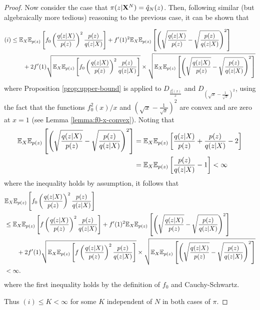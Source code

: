 \begin{proof}
Now consider the case that $\pi(z|\mathbf{X}^N) = \hat{q}_N(z)$. 
Then, following similar (but algebraically more tedious) reasoning to the previous case, it can be shown that

\begin{align*}
(i)
&\leq \mathbb{E}_{X} \mathbb{E}_{p(z)} \left[  f_0\left( \frac{q(z|X)}{p(z)} \right)^2 \frac{p(z)}{q(z|X)}\right] 
+
 f'(1)^2 \mathbb{E}_{X} \mathbb{E}_{p(z)} \left[  \left( \sqrt{\frac{q(z|X)}{p(z)}} - \sqrt{\frac{p(z)}{q(z|X)}} \right)^2\right] \\
 & \qquad + 2f'(1) \sqrt{\mathbb{E}_{X} \mathbb{E}_{p(z)} \left[  f_0\left( \frac{q(z|X)}{p(z)} \right)^2 \frac{p(z)}{q(z|X)}\right] } \times \sqrt{\mathbb{E}_{X} \mathbb{E}_{p(z)} \left[  \left( \sqrt{\frac{q(z|X)}{p(z)}} - \sqrt{\frac{p(z)}{q(z|X)}} \right)^2\right]} \\
\end{align*}
where Proposition \ref{prop:upper-bound} is applied to $D_{\frac{f_0^2(x)}{x}}$ and $D_{(\sqrt{x}- \frac{1}{\sqrt{x}})^2}$, 
using the fact that the functions $f_0^2(x)/x$ and $(\sqrt{x}- \frac{1}{\sqrt{x}})^2$ are convex and are zero at $x=1$ (see Lemma \ref{lemma:f0-x-convex}).
Noting that
\begin{align*}
    \mathbb{E}_{X} \mathbb{E}_{p(z)} \left[  \left( \sqrt{\frac{q(z|X)}{p(z)}} - \sqrt{\frac{p(z)}{q(z|X)}} \right)^2\right]
    &=\mathbb{E}_{X} \mathbb{E}_{p(z)} \left[ \frac{q(z|X)}{p(z)} + \frac{p(z)}{q(z|X)} - 2 \right] \\
    &=\mathbb{E}_{X} \mathbb{E}_{p(z)} \left[ \frac{p(z)}{q(z|X)} - 1 \right] < \infty
\end{align*}
where the inequality holds by assumption, it follows that
\begin{align*}
    &\mathbb{E}_{X} \mathbb{E}_{p(z)} \left[  f_0\left( \frac{q(z|X)}{p(z)} \right)^2 \frac{p(z)}{q(z|X)}\right]\\
    &\leq \mathbb{E}_{X} \mathbb{E}_{p(z)} \left[  f\left( \frac{q(z|X)}{p(z)} \right)^2 \frac{p(z)}{q(z|X)}\right] 
    +
    f'(1)^2 \mathbb{E}_{X} \mathbb{E}_{p(z)} \left[  \left( \sqrt{\frac{q(z|X)}{p(z)}} - \sqrt{\frac{p(z)}{q(z|X)}} \right)^2\right] \\
    & \qquad + 2f'(1) \sqrt{\mathbb{E}_{X} \mathbb{E}_{p(z)} \left[  f\left( \frac{q(z|X)}{p(z)} \right)^2 \frac{p(z)}{q(z|X)}\right] } \times \sqrt{\mathbb{E}_{X} \mathbb{E}_{p(z)} \left[  \left( \sqrt{\frac{q(z|X)}{p(z)}} - \sqrt{\frac{p(z)}{q(z|X)}} \right)^2\right]} \\
    & < \infty.
\end{align*}
where the first inequality holds by the definition of $f_0$ and Cauchy-Schwartz. 

Thus $(i) \leq K < \infty$ for some $K$ independent of $N$ in both cases of $\pi$.
\end{proof}


